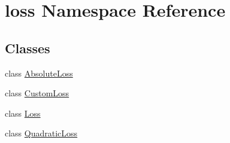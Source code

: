\hypertarget{namespaceloss}{}\section{loss Namespace Reference}
\label{namespaceloss}
\subsection*{Classes}
\begin{DoxyCompactItemize}
\item 
class \mbox{\hyperlink{classloss_1_1_absolute_loss}{Absolute\+Loss}}
\item 
class \mbox{\hyperlink{classloss_1_1_custom_loss}{Custom\+Loss}}
\item 
class \mbox{\hyperlink{classloss_1_1_loss}{Loss}}
\item 
class \mbox{\hyperlink{classloss_1_1_quadratic_loss}{Quadratic\+Loss}}
\end{DoxyCompactItemize}

